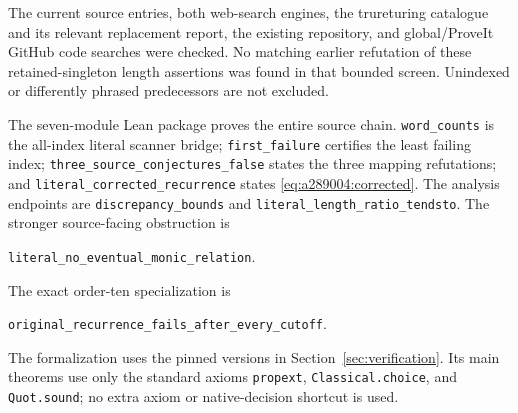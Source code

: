 The current source entries, both web-search engines, the trureturing
catalogue and its relevant replacement report, the existing repository,
and global/ProveIt GitHub code searches were checked. No matching earlier
refutation of these retained-singleton length assertions was found in
that bounded screen. Unindexed or differently phrased predecessors
are not excluded.

The seven-module Lean package proves the entire source chain.
\texttt{word\_counts} is the all-index literal scanner bridge;
\texttt{first\_failure} certifies the least failing index;
\texttt{three\_source\_conjectures\_false} states the three mapping
refutations; and \texttt{literal\_corrected\_recurrence} states
\eqref{eq:a289004:corrected}. The analysis endpoints are
\texttt{discrepancy\_bounds} and
\texttt{literal\_length\_ratio\_tendsto}. The stronger source-facing
obstruction is
\begin{center}
\texttt{literal\_no\_eventual\_monic\_relation}.
\end{center}
The exact order-ten specialization is
\begin{center}
\texttt{original\_recurrence\_fails\_after\_every\_cutoff}.
\end{center}
The formalization uses the pinned versions in
Section~\ref{sec:verification}. Its main theorems use
only the standard axioms \texttt{propext}, \texttt{Classical.choice}, and
\texttt{Quot.sound}; no extra axiom or native-decision shortcut is used.
